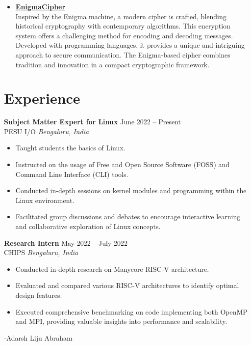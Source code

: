 \documentclass[a4paper,10pt]{article}
\begin{document}
\begin{itemize}[leftmargin=*]
   \item \textbf{\href{https://github.com/Adarsh-Liju/EnigmaCipher}{EnigmaCipher}} \\
        Inspired by the Enigma machine, a modern cipher is crafted, blending historical cryptography with contemporary algorithms. This encryption system offers a challenging method for encoding and decoding messages. Developed with programming languages, it provides a unique and intriguing approach to secure communication. The Enigma-based cipher combines tradition and innovation in a compact cryptographic framework.
\end{itemize}

\section*{Experience}
\textbf{Subject Matter Expert for Linux} \hfill June 2022 – Present \\
PESU I/O \hfill \textit{Bengaluru, India}
\begin{itemize}[leftmargin=*]
   \item Taught students the basics of Linux.
   \item Instructed on the usage of Free and Open Source Software (FOSS) and Command Line Interface (CLI) tools.
   \item Conducted in-depth sessions on kernel modules and programming within the Linux environment.
   \item Facilitated group discussions and debates to encourage interactive learning and collaborative exploration of Linux concepts.
\end{itemize}

\textbf{Research Intern} \hfill May 2022 – July 2022 \\
CHIPS \hfill \textit{Bengaluru, India}
\begin{itemize}[leftmargin=*]
   \item Conducted in-depth research on Manycore RISC-V architecture.
   \item Evaluated and compared various RISC-V architectures to identify optimal design features.
   \item Executed comprehensive benchmarking on code implementing both OpenMP and MPI, providing valuable insights into performance and scalability.
\end{itemize}

\vfill
\hspace*{\fill} -Adarsh Liju Abraham
\end{document}
